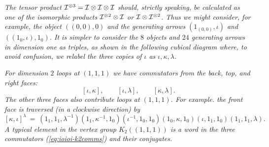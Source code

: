 \bigskip
\begin{example}
\emph{The tensor product $\mathcal{I}^{\otimes 3} = \mathcal{I}\otimes\mathcal{I}\otimes\mathcal{I}$ 
should, strictly speaking, be calculated as one of the isomorphic products 
$\mathcal{I}^{\otimes 2}\otimes\mathcal{I}$ or $\mathcal{I}\otimes\mathcal{I}^{\otimes 2}$. 
Thus we might consider, for example, the object $((0,0),0)$ 
and the generating arrows $(1_{(0,0)},\iota)$ and $((1_0,\iota),1_0)$. 
It is simpler to consider the $8$ objects and $24$ generating arrows
in dimension one as triples, as shown in the following cubical diagram where, 
to avoid confusion, we relabel the three copies of $\iota$ 
as $\iota,\kappa,\lambda$.} 

\begin{figure}[htbp]
\begin{center}

\label{figure:ioioi}
\end{center}
\end{figure}

\noindent
\emph{For dimension $2$ loops at $(1,1,1)$ we have commutators 
from the back, top, and right faces:} 
\begin{equation} \label{eq:ioioi-k2comms}
[\iota,\kappa], \qquad
[\iota,\lambda], \qquad 
[\kappa,\lambda].
\end{equation}
\emph{The other three faces also contribute loops at $(1,1,1)$. 
For example. the front face is traversed (in a clockwise direction) by} 
$$
[\kappa,\iota]^{\lambda} ~=~ 
(1_1,1_1,\lambda^{-1})(1_1,\kappa^{-1},1_0)(\iota^{-1},1_0,1_0)
(1_0,\kappa,1_0)(\iota,1_1,1_0)(1_1,1_1,\lambda).
$$
\emph{A typical element in the vertex group $K_2((1,1,1))$ is a word 
in the three commutators (\ref{eq:ioioi-k2comms}) and their conjugates.} 


\end{example}

